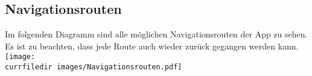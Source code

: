 \begin{samepage}
    \subsection{Navigationsrouten}\label{App_Navigation_Routen}
    Im folgenden Diagramm sind alle möglichen Navigationsrouten der App zu sehen. 
    Es ist zu beachten, dass jede Route auch wieder zurück gegangen werden kann.\\
    \texttt{[image: \\currfiledir images/Navigationsrouten.pdf]}
    
\end{samepage}